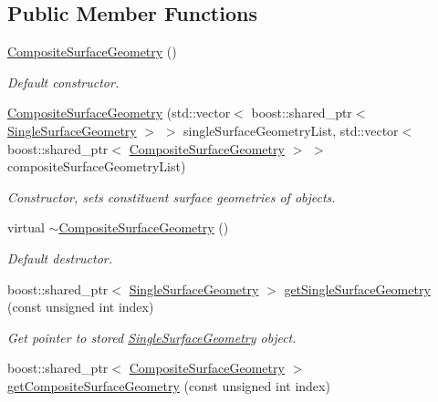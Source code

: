 \subsection*{Public Member Functions}
\begin{DoxyCompactItemize}
\item 
\hyperlink{classtudat_1_1geometric__shapes_1_1CompositeSurfaceGeometry_ab9ed61ad16ba6d4720fda53942dd7856}{Composite\+Surface\+Geometry} ()
\begin{DoxyCompactList}\small\item\em Default constructor. \end{DoxyCompactList}\item 
\hyperlink{classtudat_1_1geometric__shapes_1_1CompositeSurfaceGeometry_a602c9ca253693164c1c29e46a3428578}{Composite\+Surface\+Geometry} (std\+::vector$<$ boost\+::shared\+\_\+ptr$<$ \hyperlink{classtudat_1_1geometric__shapes_1_1SingleSurfaceGeometry}{Single\+Surface\+Geometry} $>$ $>$ single\+Surface\+Geometry\+List, std\+::vector$<$ boost\+::shared\+\_\+ptr$<$ \hyperlink{classtudat_1_1geometric__shapes_1_1CompositeSurfaceGeometry}{Composite\+Surface\+Geometry} $>$ $>$ composite\+Surface\+Geometry\+List)
\begin{DoxyCompactList}\small\item\em Constructor, sets constituent surface geometries of objects. \end{DoxyCompactList}\item 
virtual \hyperlink{classtudat_1_1geometric__shapes_1_1CompositeSurfaceGeometry_aca468e6bfcd0f755c4a269f369dcd9f4}{$\sim$\+Composite\+Surface\+Geometry} ()
\begin{DoxyCompactList}\small\item\em Default destructor. \end{DoxyCompactList}\item 
boost\+::shared\+\_\+ptr$<$ \hyperlink{classtudat_1_1geometric__shapes_1_1SingleSurfaceGeometry}{Single\+Surface\+Geometry} $>$ \hyperlink{classtudat_1_1geometric__shapes_1_1CompositeSurfaceGeometry_afd299ad37c628d31f3086ef71156bd1d}{get\+Single\+Surface\+Geometry} (const unsigned int index)
\begin{DoxyCompactList}\small\item\em Get pointer to stored \hyperlink{classtudat_1_1geometric__shapes_1_1SingleSurfaceGeometry}{Single\+Surface\+Geometry} object. \end{DoxyCompactList}\item 
boost\+::shared\+\_\+ptr$<$ \hyperlink{classtudat_1_1geometric__shapes_1_1CompositeSurfaceGeometry}{Composite\+Surface\+Geometry} $>$ \hyperlink{classtudat_1_1geometric__shapes_1_1CompositeSurfaceGeometry_a35a420c5bf311d1b24706224411643a7}{get\+Composite\+Surface\+Geometry} (const unsigned int index)

\end{DoxyCompactItemize}
